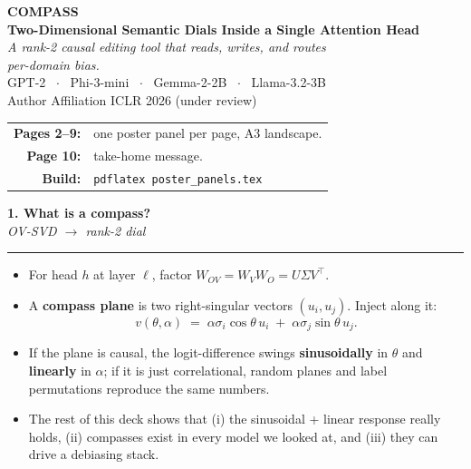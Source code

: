 \documentclass[12pt]{article}
\newcommand{\paneltitle}[2]{%
  {\noindent\color{accentA}\Huge\bfseries #1}\\[0.1em]
  {\color{muted}\LARGE\itshape #2}\par\vspace{0.3em}
  \textcolor{accentA}{\rule{\linewidth}{1.2pt}}\par\vspace{0.6em}}
\newenvironment{panelbullets}{%
  \par\vspace{0.2em}\large\begin{itemize}\setlength{\itemsep}{0.35em}}{\end{itemize}}
\begin{document}
\begin{center}
\vspace*{2cm}
{\color{accentA}\fontsize{48pt}{56pt}\selectfont\bfseries
  COMPASS}\\[0.6cm]
{\fontsize{36pt}{44pt}\selectfont\bfseries
  Two-Dimensional Semantic Dials Inside a Single Attention Head}\\[1.2cm]
{\Large\itshape
  A rank-2 causal editing tool that reads, writes, and routes\\
  per-domain bias.}\\[0.8cm]
{\LARGE GPT-2 \ $\cdot$ \ Phi-3-mini \ $\cdot$ \ Gemma-2-2B \ $\cdot$ \ Llama-3.2-3B}\\[2cm]
{\Large Author \quad\textperiodcentered\quad Affiliation \quad\textperiodcentered\quad ICLR 2026 (under review)}\\[3cm]
{\large
  \begin{tabular}{rl}
    \textbf{Pages 2--9:} & one poster panel per page, A3 landscape.\\
    \textbf{Page 10:}    & take-home message.\\
    \textbf{Build:}      & \texttt{pdflatex poster\_panels.tex}\\
  \end{tabular}}
\end{center}
\clearpage

\paneltitle{1. What is a compass?}{OV-SVD $\rightarrow$ rank-2 dial}

\begin{panelbullets}
\item For head $h$ at layer $\ell$, factor
  $W_{OV} = W_V W_O = U\Sigma V^\top$.
\item A \textbf{compass plane} is two right-singular vectors
  $(u_i, u_j)$. Inject along it:
  \[
    v(\theta, \alpha) \;=\; \alpha\sigma_i\cos\theta\,u_i \;+\;
                              \alpha\sigma_j\sin\theta\,u_j.
  \]
\item If the plane is causal, the logit-difference swings
  \textbf{sinusoidally} in $\theta$ and \textbf{linearly} in $\alpha$;
  if it is just correlational, random planes and label permutations
  reproduce the same numbers.
\item The rest of this deck shows that (i) the sinusoidal +
  linear response really holds, (ii) compasses exist in every model we
  looked at, and (iii) they can drive a debiasing stack.
\end{panelbullets}
\clearpage
\end{document}
